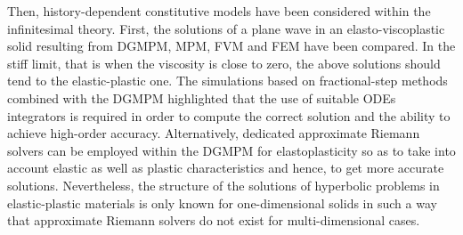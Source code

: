 Then, history-dependent constitutive models have been considered within the infinitesimal theory.
First, the solutions of a plane wave in an elasto-viscoplastic solid resulting from DGMPM, MPM, FVM and FEM have been compared.
In the stiff limit, that is when the viscosity is close to zero, the above solutions should tend to the elastic-plastic one.
The simulations based on fractional-step methods combined with the DGMPM highlighted that the use of suitable ODEs integrators is required in order to compute the correct solution and the ability to achieve high-order accuracy.
Alternatively, dedicated approximate Riemann solvers can be employed within the DGMPM for elastoplasticity so as to take into account elastic as well as plastic characteristics and hence, to get more accurate solutions.
Nevertheless, the structure of the solutions of hyperbolic problems in elastic-plastic materials is only known for one-dimensional solids in such a way that approximate Riemann solvers do not exist for multi-dimensional cases.

